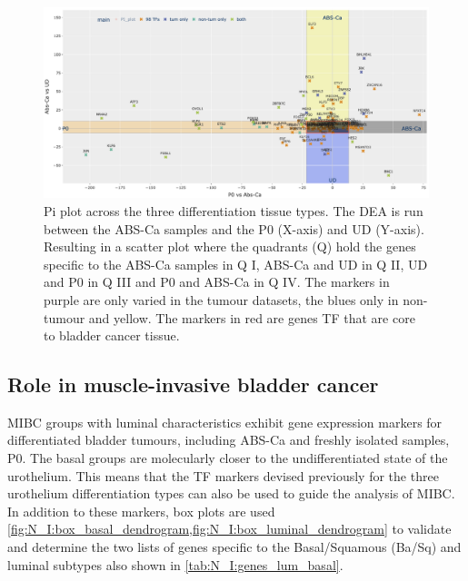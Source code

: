 \begin{figure}
    \includegraphics[width=1.0\textwidth,height=1.0\textheight,keepaspectratio]{Sections/Network_I/Resources/selective_pruning/sel_tfs/sel_tfs_pi_all_var_rect.png}
    \caption[The 98 TF and the DEA across the healthy datasets]{Pi plot across the three differentiation tissue types. The DEA is run between the ABS-Ca samples and the P0 (X-axis) and UD (Y-axis). Resulting in a scatter plot where the quadrants (Q) hold the genes specific to the ABS-Ca samples in Q I, ABS-Ca and UD in Q II, UD and P0 in Q III and P0 and ABS-Ca in Q IV. The markers in purple are only varied in the tumour datasets, the blues only in non-tumour and yellow. The markers in red are genes TF that are core to bladder cancer tissue. }
    \label{fig:N_I:pi_sel_tfs_var}
\end{figure}

\newpage


\subsection{Role in muscle-invasive bladder cancer} \label{s:N_I:sel_tfs_cancer}


 MIBC groups with luminal characteristics exhibit gene expression markers for differentiated bladder tumours, including ABS-Ca and freshly isolated samples, P0. The basal groups are molecularly closer to the undifferentiated state of the urothelium. This means that the TF markers devised previously for the three urothelium differentiation types can also be used to guide the analysis of MIBC. In addition to these markers, box plots are used \cref{fig:N_I:box_basal_dendrogram,fig:N_I:box_luminal_dendrogram} to validate and determine the two lists of genes specific to the Basal/Squamous (Ba/Sq) and luminal subtypes also shown in \cref{tab:N_I:genes_lum_basal}. 

